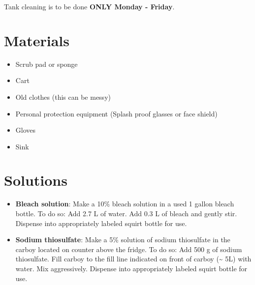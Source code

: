 \documentclass[
  letterpaper,
  DIV=11,
  numbers=noendperiod]{scrreprt}
\providecommand{\tightlist}{%
  \setlength{\itemsep}{0pt}\setlength{\parskip}{0pt}}\usepackage{longtable,booktabs,array}
\begin{document}
\begin{tcolorbox}[enhanced jigsaw, bottomtitle=1mm, rightrule=.15mm, toptitle=1mm, opacitybacktitle=0.6, bottomrule=.15mm, titlerule=0mm, coltitle=black, leftrule=.75mm, arc=.35mm, colback=white, colframe=quarto-callout-important-color-frame, left=2mm, colbacktitle=quarto-callout-important-color!10!white, title=\textcolor{quarto-callout-important-color}{\faExclamation}\hspace{0.5em}{This is important}, toprule=.15mm, opacityback=0, breakable]

Tank cleaning is to be done \textbf{ONLY Monday - Friday}.

\end{tcolorbox}

\hypertarget{materials-7}{%
\section{Materials}\label{materials-7}}

\begin{itemize}
\tightlist
\item
  Scrub pad or sponge
\item
  Cart
\item
  Old clothes (this can be messy)
\item
  Personal protection equipment (Splash proof glasses or face shield)
\item
  Gloves
\item
  Sink
\end{itemize}

\hypertarget{solutions-6}{%
\section{Solutions}\label{solutions-6}}

\begin{itemize}
\tightlist
\item
  \textbf{Bleach solution}: Make a 10\% bleach solution in a used 1
  gallon bleach bottle. To do so: Add 2.7 L of water. Add 0.3 L of
  bleach and gently stir. Dispense into appropriately labeled squirt
  bottle for use.
\item
  \textbf{Sodium thiosulfate}: Make a 5\% solution of sodium thiosulfate
  in the carboy located on counter above the fridge. To do so: Add 500 g
  of sodium thiosulfate. Fill carboy to the fill line indicated on front
  of carboy (\textasciitilde{} 5L) with water. Mix aggressively.
  Dispense into appropriately labeled squirt bottle for use.
\end{itemize}
\end{document}

